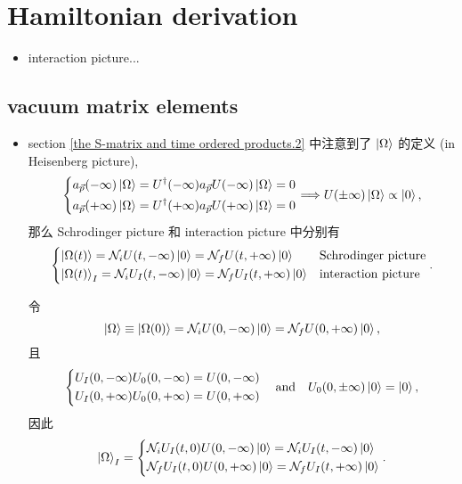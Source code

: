 \section{Hamiltonian derivation}
\begin{itemize}
	\item interaction picture...
\end{itemize}

\subsection{vacuum matrix elements} \label{subsection Feynman rules.2.1}
\begin{itemize}
	\item section \ref{the S-matrix and time ordered products.2} 中注意到了 $\ket{\Omega}$ 的定义 (in Heisenberg picture),
	\begin{equation}
		\begin{dcases}
			a_{\vec{p}}(- \infty) \ket{\Omega} = U^\dag(- \infty) a_{\vec{p}} U(- \infty) \ket{\Omega} = 0 \\
			a_{\vec{p}}(+ \infty) \ket{\Omega} = U^\dag(+ \infty) a_{\vec{p}} U(+ \infty) \ket{\Omega} = 0
		\end{dcases} \Longrightarrow U(\pm \infty) \ket{\Omega} \propto \ket{0} ,
	\end{equation}
	那么 Schrodinger picture 和 interaction picture 中分别有
	\begin{equation}
		\begin{dcases}
			\ket{\Omega(t)} = \mathcal{N}_i U(t, - \infty) \ket{0} = \mathcal{N}_f U(t, + \infty) \ket{0} & \text{Schrodinger picture} \\
			\ket{\Omega(t)}_I = \mathcal{N}_i U_I(t, - \infty) \ket{0} = \mathcal{N}_f U_I(t, + \infty) \ket{0} & \text{interaction picture}
		\end{dcases}.
	\end{equation}
	
	\begin{tcolorbox}[title=calculation:]
		令
		\begin{equation}
			\ket{\Omega} \equiv \ket{\Omega(0)} = \mathcal{N}_i U(0, - \infty) \ket{0} = \mathcal{N}_f U(0, + \infty) \ket{0},
		\end{equation}
		且
		\begin{equation}
			\begin{dcases}
				U_I(0, - \infty) U_0(0, - \infty) = U(0, - \infty) \\
				U_I(0, + \infty) U_0(0, + \infty) = U(0, + \infty)
			\end{dcases} \quad \text{and} \quad U_0(0, \pm \infty) \ket{0} = \ket{0},
		\end{equation}
		因此
		\begin{equation}
			\ket{\Omega}_I = \begin{dcases}
				\mathcal{N}_i U_I(t, 0) U(0, - \infty) \ket{0} = \mathcal{N}_i U_I(t, - \infty) \ket{0} \\
				\mathcal{N}_f U_I(t, 0) U(0, + \infty) \ket{0} = \mathcal{N}_f U_I(t, + \infty) \ket{0}
			\end{dcases}.
		\end{equation}
	\end{tcolorbox}
	

\end{itemize}
